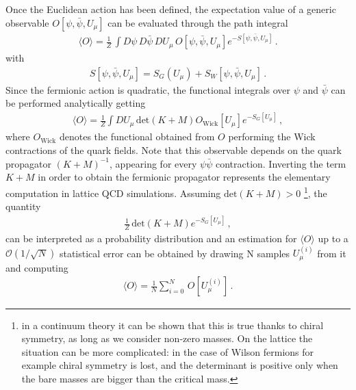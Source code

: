 %
Once the Euclidean action has been defined, the expectation value of a generic observable 
$O\left[\psi,\bar{\psi},U_{\mu}\right]$ can be evaluated
through the path integral
\begin{align} 
    \label{eq:lattice_path_integral}
    \langle O\rangle = \frac{1}{Z}\,\int D\psi\, D\bar{\psi}\,DU_{\mu}\,
    O\left[\psi,\bar{\psi},U_{\mu}\right]e^{-S[\psi,\bar{\psi},U_{\mu}]}\,.
\end{align}
with 
\begin{align}
    S[\psi,\bar{\psi},U_{\mu}] = S_G\left(U_{\mu}\right) + S_W\left[\psi,\bar{\psi}, U_{\mu}\right]\,.
\end{align}
Since the fermionic action is quadratic,
the functional integrals over $\psi$ and $\bar{\psi}$ can be performed analytically getting
\begin{align}
    \label{eq:integrated_path_integral}
    \langle O\rangle = \frac{1}{Z}\int DU_{\mu}\,\text{det}\left(K+M\right)
    O_{\text{Wick}}\left[U_{\mu}\right]e^{-S_G[U_{\mu}]}\,,
\end{align}
where $O_{\text{Wick}}$ denotes the functional obtained from $O$ performing the Wick contractions 
of the quark fields. Note that this observable depends on the quark propagator $\left(K+M\right)^{-1}$,
appearing for every $\psi\bar{\psi}$ contraction. Inverting the term $K+M$ in order to obtain the fermionic propagator
represents the elementary computation in lattice QCD simulations.
Assuming $\text{det}\left(K+M\right)>0$ \footnote{in a continuum theory it 
can be shown that this is true thanks to chiral symmetry, as long as we consider non-zero masses.
On the lattice the situation can be more complicated: in the case of Wilson fermions for example chiral symmetry is lost,
and the determinant is positive only when the bare masses are bigger than the critical mass.}, the quantity
\begin{align}
    \label{eq:prob_distribution}
    \frac{1}{Z}\,\text{det}\left(K+M\right)e^{-S_G[U_{\mu}]}\,,
\end{align}
can be interpreted as a probability distribution and an estimation
for $\langle O \rangle$ up to a $\mathcal{O}\left(1/\sqrt{N}\right)$ statistical error can be obtained by drawing
N samples $U_{\mu}^{(i)}$ from it and computing
\begin{align}
    \label{eq:average_O_lattice}
    \langle O \rangle = \frac{1}{N}\sum_{i=0}^N \, O\left[U_{\mu}^{(i)}\right]\,.
\end{align} 
